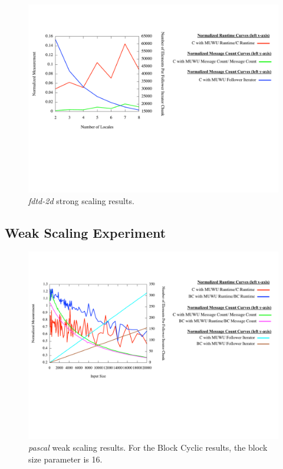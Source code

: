 \begin{figure}
\begin{center}
\includegraphics[width=\linewidth]{./Figures/strong_scaling/fdtd2d.pdf}
\caption{\textit{fdtd-2d} strong scaling results.}
\label{fdtd-2d_strong_scaling}
\end{center}
\end{figure}

\subsection{Weak Scaling Experiment}\label{subsec:input_variation}

\begin{figure}
\begin{center}
\includegraphics[width=\linewidth]{./Figures/input_variation_exp/pascal.pdf}
\caption{\textit{pascal} weak scaling results. For the Block Cyclic results, the block size parameter is 16.}
\label{pascal_weak_scaling}
\end{center}
\end{figure}

